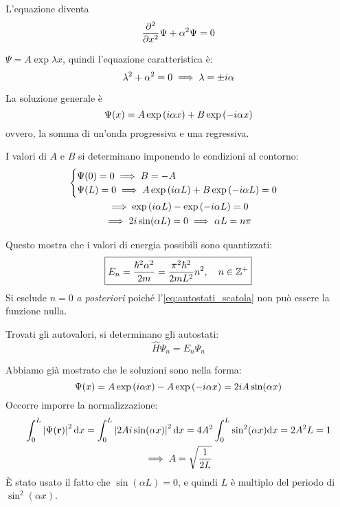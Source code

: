 L'equazione diventa
\begin{equation}
    \parder[][2]{x} \Psi + \alpha^2 \Psi = 0
\end{equation}

$\Psi = A \exp{\lambda x}$, quindi l'equazione caratteristica è:
\begin{equation}
    \lambda^2 + \alpha^2 = 0
    \implies
    \lambda = \pm i \alpha
\end{equation}

La soluzione generale è
\begin{equation}
    \Psi(x) = A \operatorname{exp}\left( i \alpha x \right) + B \operatorname{exp}\left( -i \alpha x \right)
\end{equation}
ovvero, la somma di un'onda progressiva e una regressiva.

I valori di $A$ e $B$ si determinano imponendo le condizioni al contorno:
\begin{gather}
    \begin{cases}
        \Psi(0) = 0 \implies B = -A \\
        \Psi(L) = 0 \implies A \operatorname{exp}\left( i \alpha L \right) + B \operatorname{exp}\left( -i \alpha L \right) = 0
    \end{cases} \\
    \implies \operatorname{exp}\left( i \alpha L \right) - \operatorname{exp}\left( -i \alpha L \right) = 0 \\
    \implies 2 i \sin(\alpha L) = 0
    \implies \alpha L = n \pi
\end{gather}

Questo mostra che i valori di energia possibili sono quantizzati:
\begin{equation}
    \boxed{E_n = \frac{\hbar^2 \alpha^2}{2 m} = \frac{\pi^2 \hbar^2}{2 m L^2} n^2, \quad
    n \in \mathbb{Z}^+}
\end{equation}
Si esclude $n = 0$ \textit{a posteriori} poiché l'\cref{eq:autostati_scatola} non può essere la funzione nulla.

Trovati gli autovalori, si determinano gli autostati:
\begin{equation}
    \hat{H} \Psi_n = E_n \Psi_n
\end{equation}

Abbiamo già mostrato che le soluzioni sono nella forma:
\begin{equation}
    \Psi(x) = A \operatorname{exp}\left( i \alpha x \right) - A \operatorname{exp}\left( -i \alpha x \right)
    = 2 i A \sin(\alpha x)
\end{equation}
Occorre imporre la normalizzazione:
\begin{gather}
    \int_0^L \left\lvert \Psi(\mathbf{r}) \right\rvert^2 \mathrm{d} x
    = \int_0^L \left\lvert 2 A i \sin(\alpha x) \right\rvert^2 \mathrm{d} x
    = 4 A^2 \int_0^L \sin^2(\alpha x) \mathrm{d} x
    = 2 A^2 L = 1 \\
    \implies
    A = \sqrt{\frac{1}{2 L}}
\end{gather}
È stato usato il fatto che $\sin(\alpha L) = 0$, e quindi $L$ è multiplo del periodo di $\sin^2(\alpha x)$.

